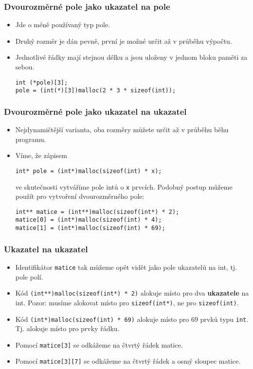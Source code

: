 \documentclass{beamer}
\newenvironment{itemizex}%
  {\large \begin{itemize}%
    \setlength{\itemsep}{8pt}%
    \setlength{\parskip}{8pt}}%
  {\end{itemize}}
\newenvironment{itemizey}%
  {\large \begin{itemize}%
    \setlength{\itemsep}{6pt}%
    \setlength{\parskip}{6pt}}%
  {\end{itemize}}
\begin{document}
\begin{frame}[t,fragile]\frametitle{Dvourozměrné pole jako ukazatel na pole} 
    \begin{itemizex}
        \item Jde o méně používaný typ pole. 
        \item Druhý rozměr je dán pevně, první je možné určit až v průběhu výpočtu.
        \item Jednotlivé řádky mají stejnou délku a jsou uloženy v jednom bloku paměti za sebou.
\begin{verbatim} 
int (*pole)[3];
pole = (int(*)[3])malloc(2 * 3 * sizeof(int));
\end{verbatim}
    \end{itemizex}
\end{frame}


\begin{frame}[t,fragile]\frametitle{Dvourozměrné pole jako ukazatel na ukazatel} 
    \begin{itemizex}
        \item Nejdynamičtější varianta, oba rozměry můžete určit až v průběhu běhu programu. 
        \item Víme, že zápisem
    \begin{verbatim} 
int* pole = (int*)malloc(sizeof(int) * x);
    \end{verbatim}
ve skutečnosti vytváříme pole intů o \texttt{x} prvcích. Podobný postup můžeme použít pro vytvoření dvourozměrného pole:
\begin{verbatim} 
int** matice = (int**)malloc(sizeof(int*) * 2);
matice[0] = (int*)malloc(sizeof(int) * 4);
matice[1] = (int*)malloc(sizeof(int) * 69);
\end{verbatim}
    \end{itemizex}
\end{frame}


\begin{frame}[t,fragile]\frametitle{Ukazatel na ukazatel} 
    \begin{itemizey}
        \item Identifikátor \texttt{matice} tak můžeme opět vidět jako pole ukazatelů na int, tj. pole polí.
        \item Kód \texttt{(int**)malloc(sizeof(int*) * 2)} alokuje místo pro dva \textbf{ukazatele} na int. Pozor: musíme alokovat místo pro \texttt{sizeof(int*)}, ne pro \texttt{sizeof(int)}.
        \item Kód \texttt{(int*)malloc(sizeof(int) * 69)} alokuje místo pro 69 prvků typu \texttt{int}. Tj. alokuje místo pro prvky řádku.
        \item Pomocí \texttt{matice[3]} se odkážeme na čtvrtý řádek matice. 
        \item Pomocí \texttt{matice[3][7]} se odkážeme na čtvrtý řádek a osmý sloupec matice. 
    \end{itemizey}
\end{frame}
\end{document}
